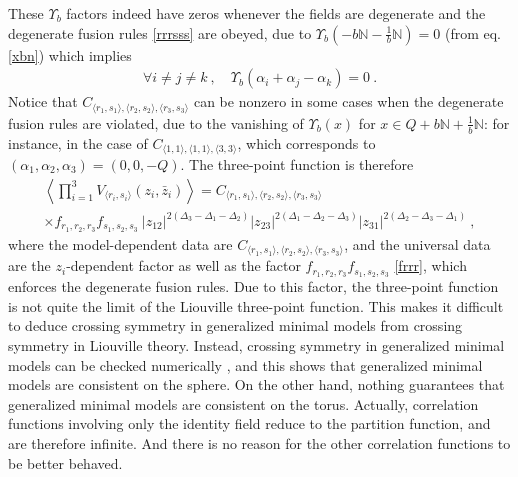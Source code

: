 \documentclass[12pt, a4paper, notitlepage, twoside]{report}
\numberwithin{equation}{section}
\theoremstyle{break}
\begin{document}
These $\Upsilon_b$ factors indeed have zeros whenever
the fields are degenerate and the degenerate fusion rules \eqref{rrrsss} are obeyed, due to $\Upsilon_b(-b{\mathbb{N}}-\frac{1}{b}{\mathbb{N}})=0$ (from eq. \eqref{xbn}) which implies 
\begin{align}
 \forall i\neq j\neq k\ , \quad \Upsilon_b(\alpha_i+\alpha_j-\alpha_k) = 0\ .
\end{align}
Notice that $C_{\langle r_1,s_1\rangle ,\langle r_2,s_2\rangle ,\langle r_3,s_3 \rangle}$ can be nonzero in some cases when the degenerate fusion rules are violated, due to the vanishing of $\Upsilon_b(x)$ for $x\in Q+b{\mathbb{N}}+\frac{1}{b}{\mathbb{N}}$: for instance, in the case of $C_{\langle 1,1\rangle , \langle 1,1 \rangle,\langle 3,3 \rangle}$, which corresponds to $(\alpha_1,\alpha_2,\alpha_3)=(0,0,-Q)$.
The three-point function is therefore 
\begin{multline}
 \left\langle \prod_{i=1}^3 V_{\langle r_i,s_i \rangle}(z_i,\bar{z}_i) \right\rangle = C_{\langle r_1,s_1\rangle ,\langle r_2,s_2\rangle ,\langle r_3,s_3 \rangle}  
\\ \times 
f_{r_1,r_2,r_3} f_{s_1,s_2,s_3}\ |z_{12}|^{2(\Delta_3-\Delta_1-\Delta_2)} |z_{23}|^{2(\Delta_1-\Delta_2-\Delta_3)} |z_{31}|^{2(\Delta_2-\Delta_3-\Delta_1)}\ ,
\end{multline}
where 
the model-dependent data are $C_{\langle r_1,s_1\rangle ,\langle r_2,s_2\rangle ,\langle r_3,s_3 \rangle}$, and the universal data are the $z_i$-dependent factor as well as the factor $f_{r_1,r_2,r_3} f_{s_1,s_2,s_3}$ \eqref{frrr}, which enforces the degenerate fusion rules. 
Due to this factor, the three-point function is not quite the limit of the Liouville three-point function. 
This makes it difficult to deduce crossing symmetry in generalized minimal models from crossing symmetry in Liouville theory. 
Instead, crossing symmetry in generalized minimal models can be checked numerically \cite{rs15}, and this shows that generalized minimal models are consistent on the sphere. 
On the other hand, nothing guarantees that generalized minimal models are consistent on the torus. Actually, correlation functions involving only the identity field reduce to the partition function, and are therefore infinite. And there is no reason for the other correlation functions to be better behaved.  
\end{document}
